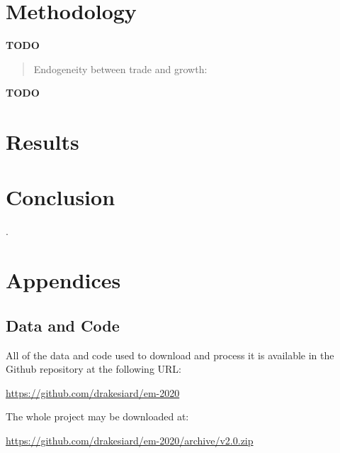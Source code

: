 \documentclass[12pt,a4paper]{article}
\begin{document}
\section{Methodology}\label{sec:methodology}

\noindent\textbf{TODO}
\begin{quote}
Endogeneity between trade and growth: 

\cite{rodriguezTradePolicyEconomic2001}
\end{quote}


\noindent\textbf{TODO}
\begin{quote}
\end{quote}



\section{Results}\label{sec:results}

\section{Conclusion}\label{sec:conclusion}

\clearpage

\appendix

\renewcommand{\refname}{\section{References}\label{sec:references}}.


\clearpage

\section{Appendices}

\subsection{Data and Code}\label{sec:data_and_code}

All of the data and code used to download and process it is available in the Github repository at the following URL:

\url{https://github.com/drakesiard/em-2020}

\noindent
The whole project may be downloaded at:

\url{https://github.com/drakesiard/em-2020/archive/v2.0.zip}
\end{document}
